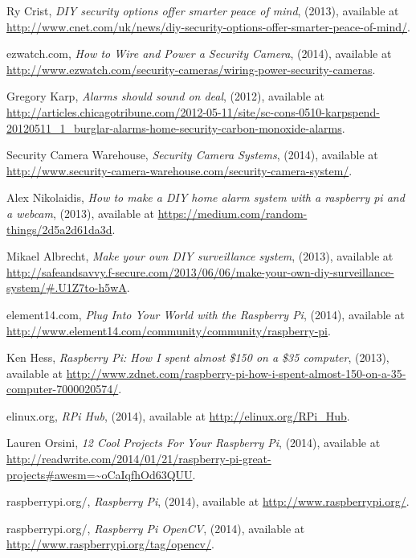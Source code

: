 \documentclass[12pt]{report}
\begin{document}
\begin{thebibliography}{99}
    Ry Crist, \emph{DIY security options offer smarter peace of mind}, (2013), available at
\url{http://www.cnet.com/uk/news/diy-security-options-offer-smarter-peace-of-mind/}.

 ezwatch.com, \emph{How to Wire and Power a Security Camera}, (2014), available at
\url{http://www.ezwatch.com/security-cameras/wiring-power-security-cameras}.

 Gregory Karp, \emph{Alarms should sound on deal}, (2012), available at
\url{http://articles.chicagotribune.com/2012-05-11/site/sc-cons-0510-karpspend-20120511_1_burglar-alarms-home-security-carbon-monoxide-alarms}.

 Security Camera Warehouse, \emph{Security Camera Systems}, (2014), available at
\url{http://www.security-camera-warehouse.com/security-camera-system/}.

 Alex Nikolaidis, \emph{How to make a DIY home alarm system with a raspberry pi and a webcam}, (2013), available at
\url{https://medium.com/random-things/2d5a2d61da3d}.


 Mikael Albrecht, \emph{Make your own DIY surveillance system}, (2013), available at
\url{http://safeandsavvy.f-secure.com/2013/06/06/make-your-own-diy-surveillance-system/#.U1Z7to-h5wA}.

 element14.com, \emph{Plug Into Your World with the Raspberry Pi}, (2014), available at
\url{http://www.element14.com/community/community/raspberry-pi}.

 Ken Hess, \emph{Raspberry Pi: How I spent almost \$150 on a \$35 computer}, (2013), available at
\url{http://www.zdnet.com/raspberry-pi-how-i-spent-almost-150-on-a-35-computer-7000020574/}.

 elinux.org, \emph{RPi Hub}, (2014), available at
\url{http://elinux.org/RPi_Hub}.


 Lauren Orsini, \emph{12 Cool Projects For Your Raspberry Pi}, (2014), available at
\url{http://readwrite.com/2014/01/21/raspberry-pi-great-projects#awesm=~oCaIqfhOd63QUU}.

 raspberrypi.org/, \emph{Raspberry Pi}, (2014), available at
\url{http://www.raspberrypi.org/}.

 raspberrypi.org/, \emph{Raspberry Pi OpenCV}, (2014), available at
\url{http://www.raspberrypi.org/tag/opencv/}.


\end{thebibliography}
\end{document}
